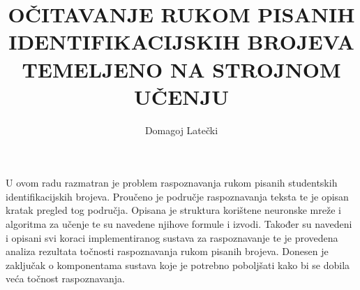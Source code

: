 \documentclass[times, utf8, diplomski]{fer}
\begin{document}

    \title{OČITAVANJE RUKOM PISANIH IDENTIFIKACIJSKIH BROJEVA TEMELJENO NA STROJNOM UČENJU}

    \author{Domagoj Latečki}



    \maketitle

    


    \listoffigures

    \listoftables

    \tableofcontents

    

    

    

    

    

    

    
    

    \appendix

    

    

    

    

    

    \begin{sazetak}
        U ovom radu razmatran je problem raspoznavanja rukom pisanih studentskih identifikacijskih brojeva. Proučeno je
        područje raspoznavanja teksta te je opisan kratak pregled tog područja. Opisana je struktura korištene neuronske
        mreže i algoritma za učenje te su navedene njihove formule i izvodi. Također su navedeni i opisani svi koraci
        implementiranog sustava za raspoznavanje te je provedena analiza rezultata točnosti raspoznavanja rukom pisanih
        brojeva. Donesen je zaključak o komponentama sustava koje je potrebno poboljšati kako bi se dobila veća točnost
        raspoznavanja.

    \end{sazetak}
\end{document}
